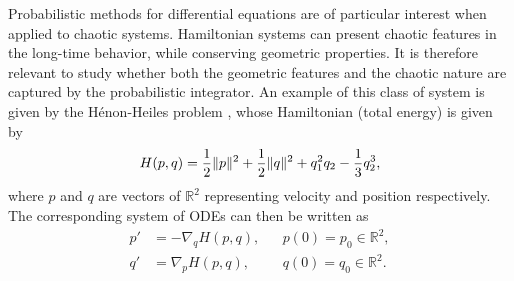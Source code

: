 \documentclass{siamart1116}
\numberwithin{theorem}{section}
\DeclarePairedDelimiter{\norm}{\|}{\|}
\newcommand{\R}{\mathbb{R}}
\begin{document}
Probabilistic methods for differential equations are of particular interest when applied to chaotic systems. Hamiltonian systems can present chaotic features in the long-time behavior, while conserving geometric properties. It is therefore relevant to study whether both the geometric features and the chaotic nature are captured by the probabilistic integrator. An example of this class of system is given by the Hénon-Heiles problem \cite{HeH64}, whose Hamiltonian (total energy) is given by
\begin{equation}\label{eq:HenHeiHam}
	H(p, q) = \frac{1}{2}\norm{p}^2 + \frac{1}{2}\norm{q}^2 + q_1^2q_2 - \frac{1}{3}q_2^3,
\end{equation}
where $p$ and $q$ are vectors of $\R^2$ representing velocity and position respectively. The corresponding system of ODEs can then be written as
\begin{equation}\label{eq:HenHei}
\begin{aligned}
	p' &= -\nabla_q H(p, q), &&p(0) = p_0 \in \R^2,\\
	q' &= \nabla_p H(p, q), &&q(0) = q_0 \in \R^2.
\end{aligned}
\end{equation}
\end{document}
